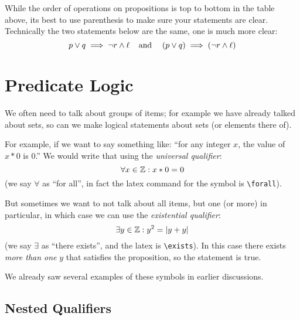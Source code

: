 \documentclass[11pt, oneside]{article}   	%
\begin{document}
While the order of operations on propositions is top to bottom in the table above, 
its best to use parenthesis to make sure your statements are clear. 
Technically the two statements below are the same, one is much more clear:
\[
p \vee q \implies \neg r \wedge \ell \;\;\;\; \textnormal{and}\;\;\;\; \left(p\vee q\right) \implies \left(\neg r \wedge \ell\right) 
\]

\section{Predicate Logic}
We often need to talk about groups of items;
for example we have already talked about sets, so can we make logical statements about sets (or elements there of). 

For example, if we want to say something like:
``for any integer $x$, the value of $x * 0$ is $0$.''
We would write that using the \emph{universal qualifier}:
\[\forall x\in\operatorname{\mathbb{Z}} : x*0 = 0\]
(we say $\forall$ as ``for all'', in fact the latex command for the symbol is \texttt{\textbackslash{}forall}).

But sometimes we want to not talk about all items, but one (or more) in particular, in which case we can use the \emph{existential qualifier}:
\[\exists y\in\operatorname{\mathbb{Z}}: y^2 = |y+y|\]
(we say $\exists$ as ``there exists'', and the latex is \texttt{\textbackslash{}exists}). 
In this case there exists \textit{more than one} $y$ that satisfies the proposition, so the statement is true.

We already saw several examples of these symbols in earlier discussions. 

 \subsection{Nested Qualifiers}
\end{document}

